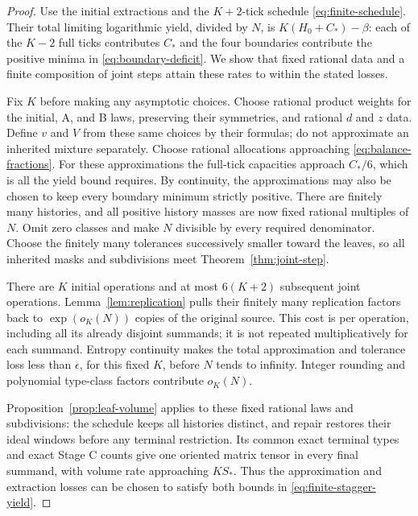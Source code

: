 \begin{proof}
Use the initial extractions and the $K+2$-tick schedule
\eqref{eq:finite-schedule}.  Their total limiting logarithmic yield,
divided by $N$, is $K(H_0+C_*)-\beta$: each of the $K-2$ full ticks
contributes $C_*$ and the four boundaries contribute the positive
minima in \eqref{eq:boundary-deficit}.  We show that fixed rational
data and a finite composition of joint steps attain these rates to
within the stated losses.

Fix $K$ before making any asymptotic choices.
Choose rational product weights for the initial, A, and B laws,
preserving their symmetries, and rational $d$ and $z$ data.  Define
$v$ and $V$ from these same choices by their formulas; do not
approximate an inherited mixture separately.  Choose rational
allocations approaching \eqref{eq:balance-fractions}.  For these
approximations the full-tick capacities approach $C_*/6$, which is
all the yield bound requires.  By continuity, the approximations may
also be chosen to keep every boundary minimum strictly positive.
There are finitely many histories,
and all positive history masses are now fixed rational multiples
of $N$.  Omit zero classes and make $N$ divisible by every required
denominator.  Choose the finitely many tolerances successively
smaller toward the leaves, so all inherited masks and subdivisions
meet Theorem~\ref{thm:joint-step}.

There are $K$ initial operations and at most $6(K+2)$ subsequent
joint operations.  Lemma~\ref{lem:replication} pulls their finitely
many replication factors back to $\exp(o_K(N))$ copies of the
original source.  This cost is per operation, including all its
already disjoint summands; it is not repeated multiplicatively for
each summand.  Entropy continuity makes the total approximation and
tolerance loss less than $\epsilon$, for this fixed $K$, before
$N$ tends to infinity.  Integer rounding and polynomial type-class
factors contribute $o_K(N)$.

Proposition~\ref{prop:leaf-volume} applies to these fixed rational
laws and subdivisions: the schedule keeps all histories distinct, and
repair restores their ideal windows before any terminal restriction.
Its common exact terminal types and exact Stage C counts give one
oriented matrix tensor in every final summand, with volume rate
approaching $KS_*$.  Thus the approximation and extraction losses can
be chosen to satisfy both bounds in \eqref{eq:finite-stagger-yield}.
\end{proof}

